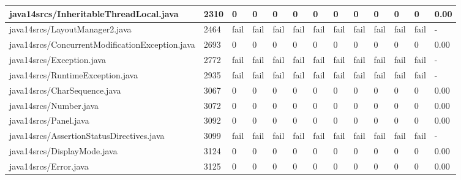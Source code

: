 \begin{tabular}{|l|l|l|l|l|l|l|l|l|l|l|l|l|}
\hline
java14srcs/InheritableThreadLocal.java             & 2310        & 0         & 0         & 0         & 0         & 0         & 0         & 0         & 0         & 0         & 0         & 0.00      \\
\hline
java14srcs/LayoutManager2.java                     & 2464        & fail      & fail      & fail      & fail      & fail      & fail      & fail      & fail      & fail      & fail      & -         \\
\hline
java14srcs/ConcurrentModificationException.java    & 2693        & 0         & 0         & 0         & 0         & 0         & 0         & 0         & 0         & 0         & 0         & 0.00      \\
\hline
java14srcs/Exception.java                          & 2772        & fail      & fail      & fail      & fail      & fail      & fail      & fail      & fail      & fail      & fail      & -         \\
\hline
java14srcs/RuntimeException.java                   & 2935        & fail      & fail      & fail      & fail      & fail      & fail      & fail      & fail      & fail      & fail      & -         \\
\hline
java14srcs/CharSequence.java                       & 3067        & 0         & 0         & 0         & 0         & 0         & 0         & 0         & 0         & 0         & 0         & 0.00      \\
\hline
java14srcs/Number.java                             & 3072        & 0         & 0         & 0         & 0         & 0         & 0         & 0         & 0         & 0         & 0         & 0.00      \\
\hline
java14srcs/Panel.java                              & 3092        & 0         & 0         & 0         & 0         & 0         & 0         & 0         & 0         & 0         & 0         & 0.00      \\
\hline
java14srcs/AssertionStatusDirectives.java          & 3099        & fail      & fail      & fail      & fail      & fail      & fail      & fail      & fail      & fail      & fail      & -         \\
\hline
java14srcs/DisplayMode.java                        & 3124        & 0         & 0         & 0         & 0         & 0         & 0         & 0         & 0         & 0         & 0         & 0.00      \\
\hline
java14srcs/Error.java                              & 3125        & 0         & 0         & 0         & 0         & 0         & 0         & 0         & 0         & 0         & 0         & 0.00      \\

\end{tabular}
